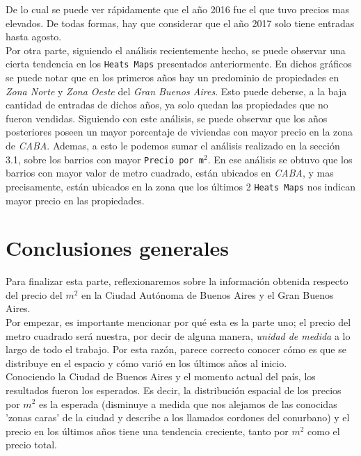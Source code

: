 \documentclass[a4paper, 10pt]{article}
\def\code#1{\texttt{#1}}
\newcommand\tab[1][0.5cm]{\hspace*{#1}}
\begin{document}
			\tab De lo cual se puede ver rápidamente que el año 2016 fue el que tuvo precios mas elevados. De todas formas, hay
			que considerar que el año 2017 solo tiene entradas hasta agosto. \\
       		\tab Por otra parte, siguiendo el análisis recientemente hecho, se puede observar una cierta tendencia en los
       		\code{Heats Maps} presentados anteriormente. En dichos gráficos se puede notar que en los primeros años hay un
       		predominio de propiedades en \textit{Zona Norte} y \textit{Zona Oeste} del \textit{Gran Buenos Aires}. Esto puede
       		deberse, a la baja cantidad de entradas de dichos años, ya solo quedan las propiedades que no fueron vendidas.
       		Siguiendo con este análisis, se puede observar que los años posteriores poseen un mayor porcentaje de viviendas con
       		mayor precio en la zona de \textit{CABA}. Ademas, a esto le podemos sumar el análisis realizado en la sección 3.1,
       		sobre los barrios con mayor \code{Precio por m$^2$}. En ese análisis se obtuvo que los barrios con mayor valor de
       		metro cuadrado, están ubicados en \textit{CABA}, y mas precisamente, están ubicados en la zona que los últimos
       		2 \code{Heats Maps} nos indican mayor precio en las propiedades.
		\section{Conclusiones generales}
			Para finalizar esta parte, reflexionaremos sobre la información obtenida respecto del precio del $m^2$ en la Ciudad
			Autónoma de Buenos Aires y el Gran Buenos Aires. \\
			\tab Por empezar, es importante mencionar por qué esta es la parte uno; el precio del metro cuadrado será nuestra, por
			decir de alguna manera, \emph{unidad de medida} a lo largo de todo el trabajo. Por esta razón, parece correcto conocer
			cómo es que se distribuye en el espacio y cómo varió en los últimos años al inicio. \\
			\tab Conociendo la Ciudad de Buenos Aires y el momento actual del país, los resultados fueron los esperados. Es decir,
			la distribución espacial de los precios por $m^2$ es la esperada (disminuye a medida que nos alejamos de las conocidas
			'zonas caras' de la ciudad y describe a los llamados cordones del conurbano) y el precio en los últimos años tiene una
			tendencia creciente, tanto por $m^2$ como el precio total.
\end{document}
